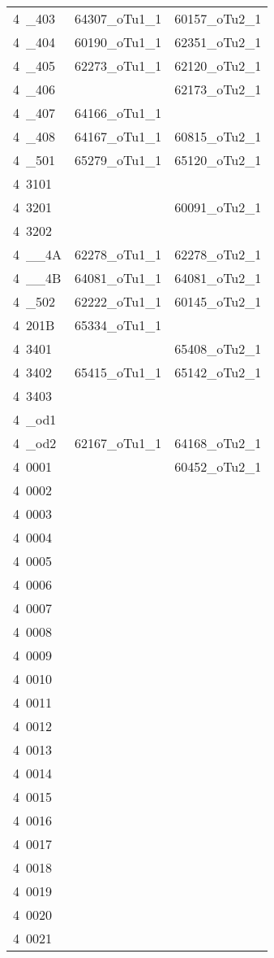 \begin{table}[htbp]
\begin{center}
{{\begin{tabular}{lcc}
   4~\_403 & 64307\_oTu1\_1 & 60157\_oTu2\_1 \\
   4~\_404 & 60190\_oTu1\_1 & 62351\_oTu2\_1 \\
   4~\_405 & 62273\_oTu1\_1 & 62120\_oTu2\_1 \\
   4~\_406 &   & 62173\_oTu2\_1 \\
   4~\_407 & 64166\_oTu1\_1 &   \\
   4~\_408 & 64167\_oTu1\_1 & 60815\_oTu2\_1 \\
   4~\_501 & 65279\_oTu1\_1 & 65120\_oTu2\_1 \\
   4~3101 &   &   \\
   4~3201 &   & 60091\_oTu2\_1 \\
   4~3202 &   &   \\
   4~\_\_4A & 62278\_oTu1\_1 & 62278\_oTu2\_1 \\
   4~\_\_4B & 64081\_oTu1\_1 & 64081\_oTu2\_1 \\
   4~\_502 & 62222\_oTu1\_1 & 60145\_oTu2\_1 \\
   4~201B & 65334\_oTu1\_1 &   \\
   4~3401 &   & 65408\_oTu2\_1 \\
   4~3402 & 65415\_oTu1\_1 & 65142\_oTu2\_1 \\
   4~3403 &   &   \\
   4~\_od1 &   &   \\
   4~\_od2 & 62167\_oTu1\_1 & 64168\_oTu2\_1 \\
   4~0001 &   & 60452\_oTu2\_1 \\
   4~0002 &   &   \\
   4~0003 &   &   \\
   4~0004 &   &   \\
   4~0005 &   &   \\
   4~0006 &   &   \\
   4~0007 &   &   \\
   4~0008 &   &   \\
   4~0009 &   &   \\
   4~0010 &   &   \\
   4~0011 &   &   \\
   4~0012 &   &   \\
   4~0013 &   &   \\
   4~0014 &   &   \\
   4~0015 &   &   \\
   4~0016 &   &   \\
   4~0017 &   &   \\
   4~0018 &   &   \\
   4~0019 &   &   \\
   4~0020 &   &   \\
   4~0021 &   &   \\
   \hline
  \end{tabular}
}  }
 \end{center}
\end{table}
